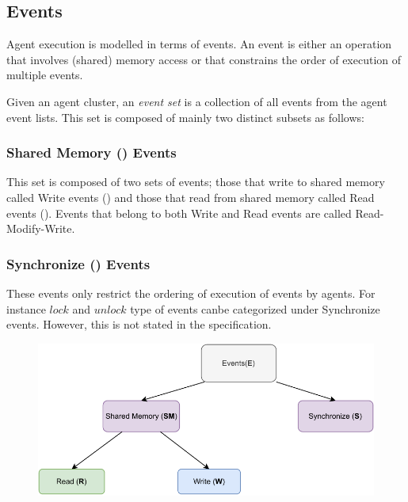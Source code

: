 \subsection{Events}
        
    Agent execution is modelled in terms of events. An event is either an operation that involves (shared) memory access or that constrains the order of execution of multiple events.

    Given an agent cluster, an \textit{event set}  is a collection of all events from the agent event lists. This set is composed of mainly two distinct subsets as follows: 

    \subsubsection{Shared Memory () Events} 
        
        This set is composed of two sets of events; those that write to shared memory called Write events () and those that read from shared memory called Read events (). Events that belong to both Write and Read events are called Read-Modify-Write. 
    
    \subsubsection{Synchronize () Events} 
        
        These events only restrict the ordering of execution of events by agents. For instance $lock$ and $unlock$ type of events canbe categorized under Synchronize events. However, this is not stated in the specification\footnotemark. 
    

    \begin{figure}[H]
        \centering 
        \includegraphics[scale=0.7]{ECMAScriptMemoryModel/EventTypes.pdf}
    \end{figure}

